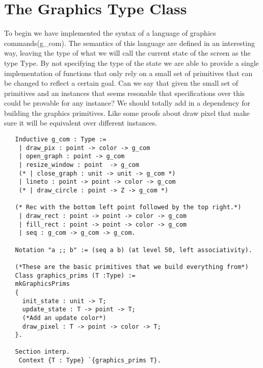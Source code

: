 \documentclass{llncs}
\begin{document}
 \section{The Graphics Type Class}
 To begin we have implemented the syntax of a language of graphics commands(g\_com). The semantics of this language are defined in an interesting way, leaving the type of what we will call the current state of the screen as the type Type.  By not specifying the type of the state we are able to
 provide a single implementation of functions that only rely on a small set of primitives that can be changed to reflect a certain goal.
 {\color{red} Can we say that given the small set of primitives and an instances that seems resonable that specifications over this could be
   provable for any instance? We should totally add in a dependency for building the graphics primitives.  Like some proofs about draw pixel that
  make sure it will be equivalent over different instances. }

 \begin{lstlisting}
   Inductive g_com : Type :=
    | draw_pix : point -> color -> g_com
    | open_graph : point -> g_com
    | resize_window : point  -> g_com
    (* | close_graph : unit -> unit -> g_com *)
    | lineto : point -> point -> color -> g_com
    (* | draw_circle : point -> Z -> g_com *)

   (* Rec with the bottom left point followed by the top right.*)          
    | draw_rect : point -> point -> color -> g_com
    | fill_rect : point -> point -> color -> g_com
    | seq : g_com -> g_com -> g_com.

   Notation "a ;; b" := (seq a b) (at level 50, left associativity).

   (*These are the basic primitives that we build everything from*)
   Class graphics_prims (T :Type) :=
   mkGraphicsPrims
   {
     init_state : unit -> T;
     update_state : T -> point -> T;
     (*Add an update color*)
     draw_pixel : T -> point -> color -> T;
   }.

   Section interp.
    Context {T : Type} `{graphics_prims T}.

  \end{lstlisting}
  
\end{document}
